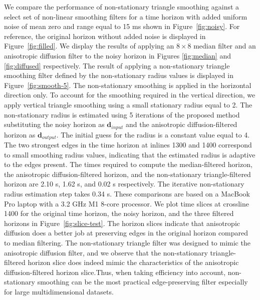 We compare the performance of non-stationary triangle smoothing against a select set of non-linear smoothing filters for a time horizon with added uniform noise of mean zero and range equal to 15 ms shown in Figure~\ref{fig:noisy}. For reference, the original horizon without added noise is displayed in Figure~\ref{fig:filled}. We display the results of applying an $8\times8$ median filter and an anisotropic diffusion filter to the noisy horizon in Figures \ref{fig:median} and \ref{fig:diffused} respectively. The result of applying a non-stationary triangle smoothing filter defined by the non-stationary radius values is displayed in Figure~\ref{fig:smooth-5}. 
The non-stationary smoothing is applied in the horizontal direction only. To account for the smoothing required in the vertical direction, we apply vertical triangle smoothing using a small stationary radius equal to 2. The non-stationary radius is estimated using 5 iterations of the proposed method substituting the noisy horizon as $\mathbf{d}_{input}$ and the anisotropic diffusion-filtered horizon as $\mathbf{d}_{output}$. The initial guess for the radius is a constant value equal to 4. The two strongest edges in the time horizon at inlines 1300 and 1400 correspond to small smoothing radius values, indicating that the estimated radius is adaptive to the edges present. The times required to compute the median-filtered horizon, the anisotropic diffusion-filtered horizon, and the non-stationary triangle-filtered horizon are 2.10 s, 1.62 s, and 0.02 s respectively. The iterative non-stationary radius estimation step takes 0.34 s. These comparisons are based on a MacBook Pro laptop with a 3.2 GHz M1 8-core processor. We plot time slices at crossline 1400 for the original time horizon, the noisy horizon, and the three filtered horizons in Figure~\ref{fig:slice-test}. The horizon slices indicate that anisotropic diffusion does a better job at preserving edges in the original horizon compared to median filtering. The non-stationary triangle filter was designed to mimic the anisotropic diffusion filter, and we observe that the non-stationary triangle-filtered horizon slice does indeed mimic the characteristics of the anisotropic diffusion-filtered horizon slice.Thus, when taking efficiency into account, non-stationary smoothing can be the most practical edge-preserving filter especially for large multidimensional datasets. 



